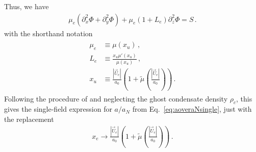 \documentclass[reprint, amsmath,amssymb, nofootinbib, aps, prd]{revtex4-2}
\begin{document}
Thus, we have
\begin{align}
\mu_e (\partial_x^2 \Phi + \partial_y^2 \Phi) + \mu_e (1 + L_e) \partial_z^2 \Phi = S \,.
\end{align}
with the shorthand notation
\begin{align}
\begin{split}
 \mu_e &\equiv \mu(x_u) \,, \\
 L_e &\equiv \frac{x_u \mu'(x_u)}{\mu(x_u)} \,, \\
 x_u &\equiv \frac{|\vec{U}_e|}{a_0} \left( 1 + \tilde{\mu}\left(\frac{|\vec{U}_e|}{a_0}\right)\right) \,.
\end{split}
\end{align}
Following the procedure of \cite{Banik2015} and neglecting the ghost condensate density $\rho_c$, this gives the single-field expression for $a/a_N$ from Eq.~\eqref{eq:aoveraNsingle}, just with the replacement
\begin{align}
 x_e \to \frac{|\vec{U}_e|}{a_0} \left( 1 + \tilde{\mu}\left(\frac{|\vec{U}_e|}{a_0}\right)\right)\,.
\end{align}


\end{document}
